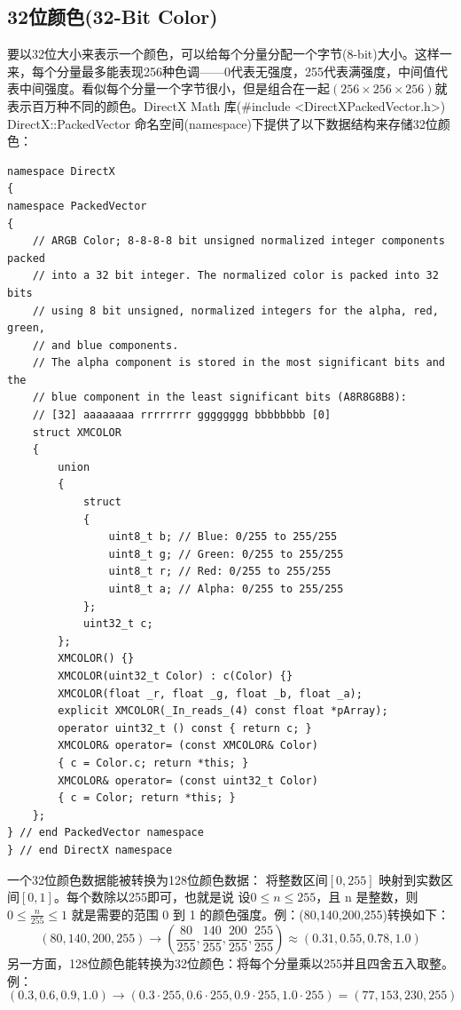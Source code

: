 \documentclass[11pt,a4paper,oldfontcommands]{memoir}
\begin{document}
{\subsection{32位颜色(32-Bit Color)}
\begin{flushleft}
要以32位大小来表示一个颜色，可以给每个分量分配一个字节(8-bit)大小。这样一来，每个分量最多能表现256种色调——0代表无强度，255代表满强度，中间值代表中间强度。看似每个分量一个字节很小，但是组合在一起$(256 \times 256 \times 256)$就表示百万种不同的颜色。DirectX Math 库(\#include <DirectXPackedVector.h>) DirectX::PackedVector 命名空间(namespace)下提供了以下数据结构来存储32位颜色：
\begin{lstlisting}
namespace DirectX
{
namespace PackedVector
{
    // ARGB Color; 8-8-8-8 bit unsigned normalized integer components packed
    // into a 32 bit integer. The normalized color is packed into 32 bits
    // using 8 bit unsigned, normalized integers for the alpha, red, green,
    // and blue components.
    // The alpha component is stored in the most significant bits and the
    // blue component in the least significant bits (A8R8G8B8):
    // [32] aaaaaaaa rrrrrrrr gggggggg bbbbbbbb [0]
    struct XMCOLOR
    {
        union
        {
            struct
            {
                uint8_t b; // Blue: 0/255 to 255/255
                uint8_t g; // Green: 0/255 to 255/255
                uint8_t r; // Red: 0/255 to 255/255
                uint8_t a; // Alpha: 0/255 to 255/255
            };
            uint32_t c;
        };
        XMCOLOR() {}
        XMCOLOR(uint32_t Color) : c(Color) {}
        XMCOLOR(float _r, float _g, float _b, float _a);
        explicit XMCOLOR(_In_reads_(4) const float *pArray);
        operator uint32_t () const { return c; }
        XMCOLOR& operator= (const XMCOLOR& Color) 
        { c = Color.c; return *this; }
        XMCOLOR& operator= (const uint32_t Color) 
        { c = Color; return *this; }
    };
} // end PackedVector namespace
} // end DirectX namespace
\end{lstlisting}
一个32位颜色数据能被转换为128位颜色数据： 将整数区间$[0, 255]$ 映射到实数区间$[0, 1]$。每个数除以255即可，也就是说 设$0 \leq n \leq 255$，且 n 是整数，则 $0 \leq \frac{n}{255} \leq 1$ 就是需要的范围 0 到 1 的颜色强度。例：(80,140,200,255)转换如下：
$$ (80,140,200,255)\rightarrow (\frac{80}{255},\frac{140}{255},\frac{200}{255},\frac{255}{255}) \approx (0.31,0.55,0.78,1.0)$$
另一方面，128位颜色能转换为32位颜色：将每个分量乘以255并且四舍五入取整。例：
$$(0.3,0.6,0.9,1.0)\rightarrow (0.3\cdot 255,0.6\cdot 255,0.9\cdot 255,1.0\cdot 255)=(77,153,230,255)$$


\end{flushleft}}
\end{document}

